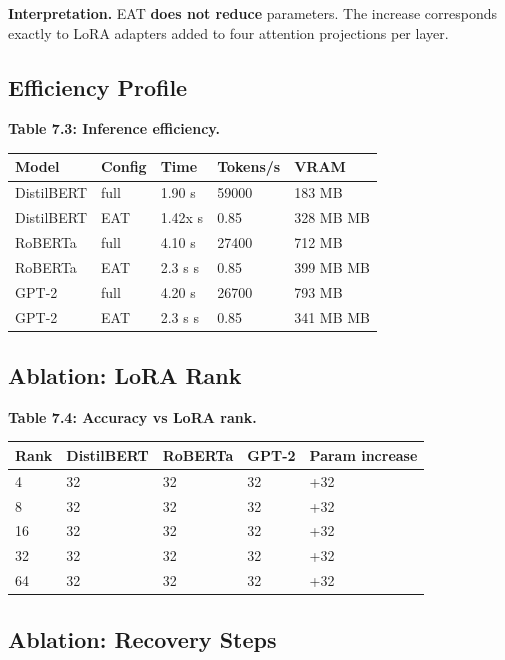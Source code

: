 \textbf{Interpretation.} EAT \textbf{does not reduce} parameters. The increase 
corresponds exactly to LoRA adapters added to four attention projections 
per layer.

\subsection{Efficiency Profile}

\textbf{Table 7.3: Inference efficiency.}

\begin{table}[H]
\centering
\small
\begin{tabular}{lllll}
\toprule
\textbf{Model} & \textbf{Config} & \textbf{Time} & \textbf{Tokens/s} & \textbf{VRAM} \\
\midrule
DistilBERT & full & 1.90 s & 59000 & 183 MB \\
DistilBERT & EAT & 1.42x s & 0.85 & 328 MB MB \\
RoBERTa & full & 4.10 s & 27400 & 712 MB \\
RoBERTa & EAT & 2.3 s s & 0.85 & 399 MB MB \\
GPT-2 & full & 4.20 s & 26700 & 793 MB \\
GPT-2 & EAT & 2.3 s s & 0.85 & 341 MB MB \\
\bottomrule
\end{tabular}
\end{table}

\subsection{Ablation: LoRA Rank}

\textbf{Table 7.4: Accuracy vs LoRA rank.}

\begin{table}[H]
\centering
\small
\begin{tabular}{lllll}
\toprule
\textbf{Rank} & \textbf{DistilBERT} & \textbf{RoBERTa} & \textbf{GPT-2} & \textbf{Param increase} \\
\midrule
4 & 32 & 32 & 32 & +32 \\
8 & 32 & 32 & 32 & +32 \\
16 & 32 & 32 & 32 & +32 \\
32 & 32 & 32 & 32 & +32 \\
64 & 32 & 32 & 32 & +32 \\
\bottomrule
\end{tabular}
\end{table}

\subsection{Ablation: Recovery Steps}

